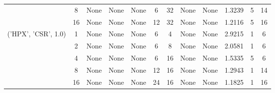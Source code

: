 \begin{tabular}{cccccccccccc}
& 8& None& None& None& 6& 32& None& None& 1.3239& 5& 14\\
& 16& None& None& None& 12& 32& None& None& 1.2116& 5& 16\\
\hline
\multirow{5}{*}{('HPX', 'CSR', 1.0)}& 1& None& None& None& 6& 4& None& None& 2.9215& 1& 6\\
& 2& None& None& None& 6& 8& None& None& 2.0581& 1& 6\\
& 4& None& None& None& 6& 16& None& None& 1.5335& 5& 6\\
& 8& None& None& None& 12& 16& None& None& 1.2943& 1& 14\\
& 16& None& None& None& 24& 16& None& None& 1.1825& 1& 16\\
\hline
\end{tabular}




